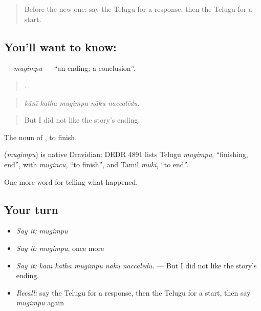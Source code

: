 \label{lesson:TE-C376-mugimpu}



\begin{quote}
Before the new one: say the Telugu for a response, then the Telugu for a start.
\end{quote}

\subsection*{You'll want to know: }
\textbf{} — \emph{mugimpu} — \textquotedblleft{}an ending; a conclusion\textquotedblright{}.

\begin{quote}
    .
\end{quote}

\begin{quote}
\emph{kānī katha mugimpu nāku naccalēdu.}
\end{quote}

\begin{quote}
But I did not like the story's ending.
\end{quote}

The noun of , to finish.

\begin{cousinweb}
\textbf{} (\emph{mugimpu}) is native Dravidian: DEDR 4891 lists Telugu \emph{mugimpu}, \textquotedblleft{}finishing, end\textquotedblright{}, with \emph{mugincu}, \textquotedblleft{}to finish\textquotedblright{}, and Tamil \emph{muki}, \textquotedblleft{}to end\textquotedblright{}.
\end{cousinweb}

\begin{grammarlens}[title={What you've built}]
One more word for telling what happened.
\end{grammarlens}

\subsection*{Your turn}
\begin{itemize}
\raggedright
  \item \emph{Say it:} \emph{mugimpu}
  \item \emph{Say it:} \emph{mugimpu}, once more
  \item \emph{Say it:} \emph{kānī katha mugimpu nāku naccalēdu.} — But I did not like the story's ending.
  \item \emph{Recall:} say the Telugu for a response, then the Telugu for a start, then say \emph{mugimpu} again
\end{itemize}

